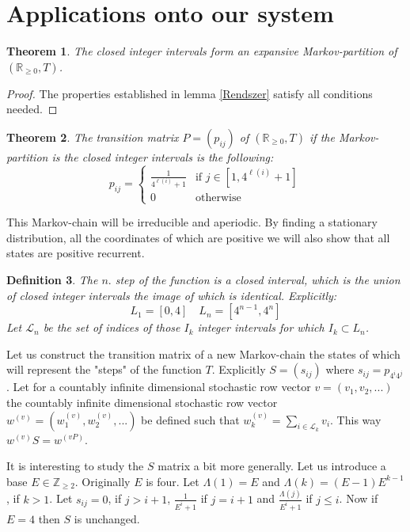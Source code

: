 \documentclass{article}
\newtheorem{theorem}{Theorem}[section]
\newtheorem{defin}[theorem]{Definition}
\begin{document}
\section{Applications onto our system}

\begin{theorem}
The closed integer intervals form an expansive Markov-partition of $(\mathbb{R}_{\geq 0}, T)$.
\end{theorem}

\begin{proof}
The properties established in lemma \ref{Rendszer} satisfy all conditions needed.
\end{proof}

\begin{theorem}
The transition matrix $P = (p_{ij})$ of $(\mathbb{R}_{\geq 0}, T)$ if the Markov-partition is the closed integer intervals is the following:\[
p_{ij} =
\begin{cases}
		\frac{1}{4^{ \ell (i) }+1} & \text{if } j \in [1, 4^{\ell(i)}+1]\\
		0 & \text{otherwise } 
	\end{cases}
\]
\end{theorem}

This Markov-chain will be irreducible and aperiodic. By finding a stationary distribution, all the coordinates of which are positive we will also show that all states are positive recurrent.

\begin{defin}
The $n.$ step of the function is a closed interval, which is the union of closed integer intervals the image of which is identical. Explicitly:\[
L_1 = [0, 4] \quad
L_n = [4^{n-1}, 4^n]
\]
Let $\mathscr{L}_n$ be the set of indices of those $I_k$ integer intervals for which $I_k \subset L_n$. 

\end{defin}

Let us construct the transition matrix of a new Markov-chain the states of which will represent the "steps" of the function $T$. Explicitly $S=(s_{ij})$ where $s_{ij}=p_{4^i 4^j}$. Let for a countably infinite dimensional stochastic row vector $v = (v_1, v_2, ...)$ the countably infinite dimensional stochastic row vector $w^{(v)} = (w^{(v)}_1, w^{(v)}_2, ...)$ be defined such that $w^{(v)}_k = \sum_{i \in \mathscr{L}_k}v_i$. This way $w^{(v)}S = w^{(vP)}$.

It is interesting to study the $S$ matrix a bit more generally. Let us introduce a base $E\in \mathbb{Z}_{\geq 2}$. Originally $E$ is four. Let $\Lambda(1)=E$ and $\Lambda(k)=(E-1)E^{k-1}$, if $k>1$. Let $s_{ij}=0$, if $j>i+1$, $\frac{1}{E^i+1}$ if $j=i+1$ and $\frac{\Lambda(j)}{E^i + 1}$ if $j \leq i$. Now if $E=4$ then $S$ is unchanged.\\
\end{document}
